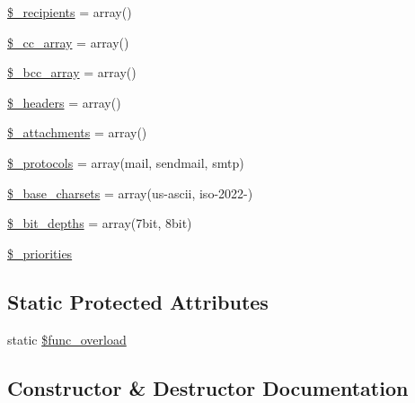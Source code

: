 \begin{DoxyCompactItemize}
\item 
\mbox{\hyperlink{class_c_i___email_aa5f5e78dd9477bdec18b4aadae77ba13}{\$\+\_\+recipients}} = array()
\item 
\mbox{\hyperlink{class_c_i___email_af979b4b8dc11cd847482938c13fd527d}{\$\+\_\+cc\+\_\+array}} = array()
\item 
\mbox{\hyperlink{class_c_i___email_a9e55a2ff848d216fa27361d3c66d979d}{\$\+\_\+bcc\+\_\+array}} = array()
\item 
\mbox{\hyperlink{class_c_i___email_a1481ae63a7fb295087c3a668a0359500}{\$\+\_\+headers}} = array()
\item 
\mbox{\hyperlink{class_c_i___email_a36f182452832f13cf40ab24ee9ffce90}{\$\+\_\+attachments}} = array()
\item 
\mbox{\hyperlink{class_c_i___email_a67dcd847790518bf5fbe6576a0c11c04}{\$\+\_\+protocols}} = array(\textquotesingle{}mail\textquotesingle{}, \textquotesingle{}sendmail\textquotesingle{}, \textquotesingle{}smtp\textquotesingle{})
\item 
\mbox{\hyperlink{class_c_i___email_a212a02e70f089ba2e1a29bd6f45b0691}{\$\+\_\+base\+\_\+charsets}} = array(\textquotesingle{}us-\/ascii\textquotesingle{}, \textquotesingle{}iso-\/2022-\/\textquotesingle{})
\item 
\mbox{\hyperlink{class_c_i___email_a65b779b2385490a293d286a135bdf00c}{\$\+\_\+bit\+\_\+depths}} = array(\textquotesingle{}7bit\textquotesingle{}, \textquotesingle{}8bit\textquotesingle{})
\item 
\mbox{\hyperlink{class_c_i___email_af2e56ba04b214aad41be6db88e729645}{\$\+\_\+priorities}}
\end{DoxyCompactItemize}
\subsection*{Static Protected Attributes}
\begin{DoxyCompactItemize}
\item 
static \mbox{\hyperlink{class_c_i___email_aef84be58d58a5895572c5689e56a1047}{\$func\+\_\+overload}}
\end{DoxyCompactItemize}


\subsection{Constructor \& Destructor Documentation}
\mbox{\label{class_c_i___email_a35018c0dc92a448db5c4686364ced754}} 
